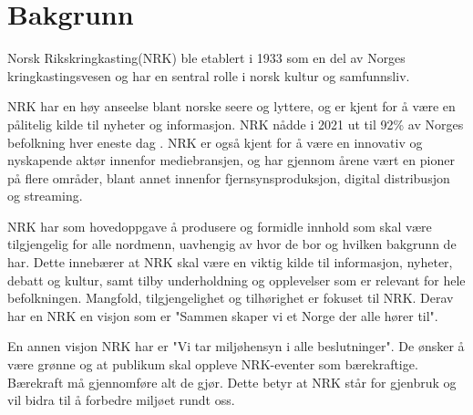 \newpage
\section{Bakgrunn}
\label{sec:bakgrunn}
Norsk Rikskringkasting(NRK) ble etablert i 1933 som en del av Norges kringkastingsvesen og har en sentral rolle i norsk kultur og samfunnsliv.

NRK har en høy anseelse blant norske seere og lyttere, og er kjent for å være en pålitelig kilde til nyheter og informasjon. NRK nådde i 2021 ut til 92\% av Norges befolkning hver eneste dag \cite[s. 7]{NRK_årsrapport_2021}. NRK er også kjent for å være en innovativ og nyskapende aktør innenfor mediebransjen, og har gjennom årene vært en pioner på flere områder, blant annet innenfor fjernsynsproduksjon, digital distribusjon og streaming.

NRK har som hovedoppgave å produsere og formidle innhold som skal være tilgjengelig for alle nordmenn, uavhengig av hvor de bor og hvilken bakgrunn de har. Dette innebærer at NRK skal være en viktig kilde til informasjon, nyheter, debatt og kultur, samt tilby underholdning og opplevelser som er relevant for hele befolkningen. Mangfold, tilgjengelighet og tilhørighet er fokuset til NRK.  Derav har en NRK en visjon som er "Sammen skaper vi et Norge der alle hører til". 



En annen visjon NRK har er "Vi tar miljøhensyn i alle beslutninger". De ønsker å være grønne og at publikum skal oppleve NRK-eventer som bærekraftige. Bærekraft må gjennomføre alt de gjør. Dette betyr at NRK står for gjenbruk og vil bidra til å forbedre miljøet rundt oss.   


  


